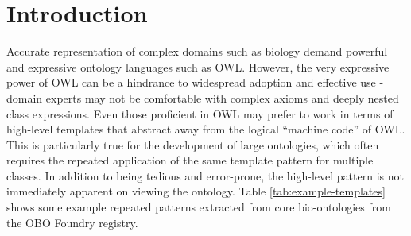 \documentclass{llncs}
\begin{document}
\section{Introduction}


Accurate representation of complex domains such as biology demand
powerful and expressive ontology languages such as OWL. However, the
very expressive power of OWL can be a hindrance to widespread adoption
and effective use - domain experts may not be comfortable with complex
axioms and deeply nested class expressions. Even those proficient in
OWL may prefer to work in terms of high-level templates that abstract
away from the logical ``machine code'' of OWL. This is particularly
true for the development of large ontologies, which often requires the
repeated application of the same template pattern for multiple
classes. In addition to being tedious and error-prone, the high-level
pattern is not immediately apparent on viewing the ontology. Table
\ref{tab:example-templates} shows some example repeated patterns
extracted from core bio-ontologies from the OBO Foundry
registry\cite{Smith2007}.
\end{document}
